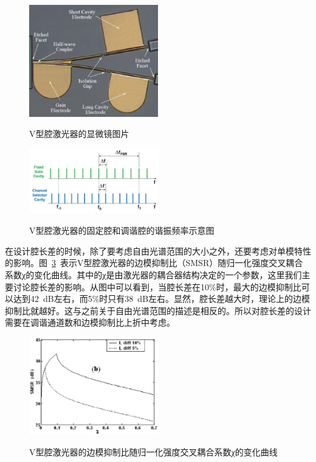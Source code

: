 \documentclass{ZJUthesis}
\begin{document}
\begin{figure}[htbp]
  \centering
  \includegraphics[width=0.5\textwidth]{./Pictures/vccl.eps}\\
  \caption{V型腔激光器的显微镜图片}
  \label{fig_vccl}
\end{figure}

\begin{figure}[htbp]
  \centering
  \includegraphics[width=0.5\textwidth]{./Pictures/vccl_f.eps}\\
  \caption{V型腔激光器的固定腔和调谐腔的谐振频率示意图}
  \label{fig_vccl_f}
\end{figure}

在设计腔长差的时候，除了要考虑自由光谱范围的大小之外，还要考虑对单模特性的影响。图~\ref{fig_vccl_smsr}~表示V型腔激光器的边模抑制比（SMSR）随归一化强度交叉耦合系数χ的变化曲线。其中的χ是由激光器的耦合器结构决定的一个参数，这里我们主要讨论腔长差的影响。从图中可以看到，当腔长差在10\%时，最大的边模抑制比可以达到42~dB左右，而5\%时只有38~dB左右。显然，腔长差越大时，理论上的边模抑制比就越好。这与之前关于自由光谱范围的描述是相反的。所以对腔长差的设计需要在调谐通道数和边模抑制比上折中考虑。

\begin{figure}[htbp]
  \centering
  \includegraphics[width=0.5\textwidth]{./Pictures/vccl_smsr.eps}\\
  \caption{V型腔激光器的边模抑制比随归一化强度交叉耦合系数χ的变化曲线}
  \label{fig_vccl_smsr}
\end{figure}
\end{document}
